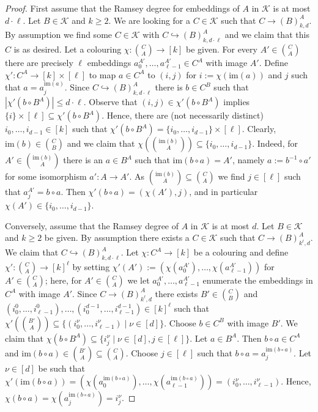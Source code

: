 \documentclass[12pt]{amsart}
\theoremstyle{plain}
\theoremstyle{definition}
\begin{document}
\begin{proof} First assume that the Ramsey degree for embeddings of $A$ in ${\mathcal K}$ is at most $d\cdot\ell$. Let $B\in{\mathcal K}$ and $k\ge 2$. We are looking for a $C\in{\mathcal K}$ such that $C\to(B)_{k,d}^A$. By assumption we find some $C\in{\mathcal K}$ with $C\hookrightarrow(B)^A_{k,d\cdot\ell}$ and we claim that this $C$ is as desired. Let a colouring $\chi:{C\choose A}\to[k]$ be given.
For every $A'\in {C\choose A}$ there are precisely $\ell$ embeddings $a^{A'}_0,\ldots, a^{A'}_{\ell-1}\in C^A$ with image $A'$. Define $\chi':C^A\to[k]\times[\ell]$ to map $a\in C^A$ to $(i,j)$ for $i:=\chi({\mathrm{im}}(a))$ and $j$ such that
$a=a_j^{{\mathrm{im}}(a)}$. Since  $C\hookrightarrow(B)^A_{k,d\cdot\ell}$ there is $b\in C^B$ such that $|\chi'(b\circ B^A)|\le d\cdot\ell$. 
Observe that $(i,j)\in\chi'(b\circ B^A)$ implies $\{i\}\times[\ell]\subseteq\chi'(b\circ B^A)$. Hence, there are (not necessarily distinct) $i_0,\ldots,i_{d-1}\in[k]$ such that $\chi'(b\circ B^A)=\{i_0,\ldots,i_{d-1}\}\times[\ell]$.
Clearly, ${\mathrm{im}}(b)\in{C\choose B}$ and we claim that $\chi({{\mathrm{im}}(b)\choose A})\subseteq \{i_0,\ldots,i_{d-1}\}$. Indeed, for $A'\in{{\mathrm{im}}(b)\choose A}$ there is an $a\in B^A$ such that ${\mathrm{im}}(b\circ a)=A'$, namely $a:= b^{-1}\circ a'$ for some isomorphism $a':A\rightarrow A'$. As ${{\mathrm{im}}(b)\choose A}\subseteq {C\choose A}$ we find $j\in[\ell]$ such that $a_j^{A'}=b\circ a$. Then $\chi'(b\circ a)=(\chi(A'),j)$, and in particular $\chi(A')\in \{i_0,\ldots,i_{d-1}\}$.

Conversely, assume that the Ramsey degree of $A$ in ${\mathcal K}$ is at most $d$. Let $B\in{\mathcal K}$ and $k\ge 2$ be given. 
By assumption there exists a $C\in{\mathcal K}$ such that $C\to(B)^A_{k^\ell,d}$. We claim that $C\hookrightarrow(B)_{k,d\cdot\ell}^A$.
Let $\chi:C^A\to[k]$ be a colouring and define $\chi':{C\choose A}\to[k]^{\ell}$ by setting
$\chi'(A'):=(\chi(a_0^{A'}),\ldots,\chi(a_{\ell-1}^{A'}))$ for $A'\in{C\choose A}$; here, for $A'\in{C\choose A}$ we let $a_0^{A'},\ldots,a_{\ell-1}^{A'}$ enumerate the embeddings in $C^A$ with image $A'$. Since $C\rightarrow(B)_{k^{\ell},d}^A$ there exists $B'\in{C\choose B}$ and $(i^{0}_0,\ldots, i^0_{\ell-1}),\ldots,(i^{d-1}_0,\ldots, i^{d-1}_{\ell-1})\in[k]^{\ell}$ 
such that $\chi'({B'\choose A})\subseteq\{(i^\nu_0,\ldots,i^\nu_{\ell-1})\mid \nu\in[d]\}$. 
Choose $b \in C^B $ with image $B'$. We claim that $\chi(b\circ B^A)\subseteq\{i^{\nu}_j\mid \nu\in[d],j\in[\ell]\}$.
Let $a\in B^A$. Then $b\circ a\in C^A$ and ${\mathrm{im}}(b\circ a)\in {B'\choose A}\subseteq {C\choose A}$. Choose $j\in[\ell]$ such that
$b\circ a=a_j^{{\mathrm{im}}(b\circ a)}$. Let $\nu\in[d]$ be such that 
$\chi'({\mathrm{im}}(b\circ a))=(\chi(a_0^{{\mathrm{im}}(b\circ a)}),\ldots,\chi(a_{\ell-1}^{{\mathrm{im}}(b\circ a)}))=
(i^\nu_0,\ldots,i^\nu_{\ell-1})$. Hence, $\chi(b\circ a)=\chi(a_{j}^{{\mathrm{im}}(b\circ a)})=i^{\nu}_j$.
\end{proof}
\end{document}
